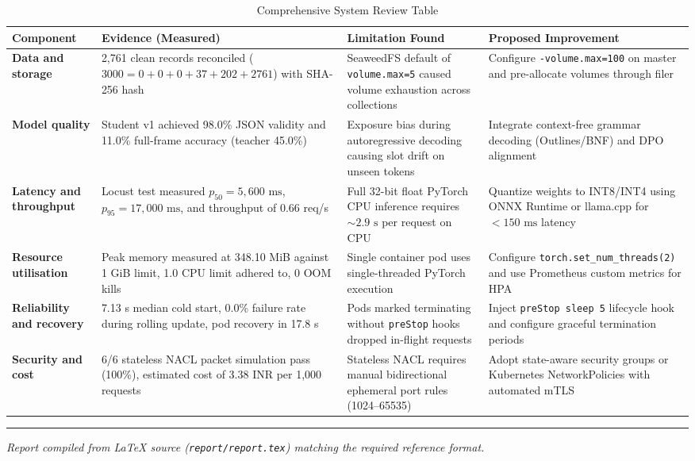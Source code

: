 \documentclass[10pt,a4paper]{article}
\begin{document}
\begin{table}[h!]
\centering
\small
\begin{tabularx}{\textwidth}{l p{3.6cm} Y Y}
\toprule
\textbf{Component} & \textbf{Evidence (Measured)} & \textbf{Limitation Found} & \textbf{Proposed Improvement} \\
\midrule
\textbf{Data and storage} & 2,761 clean records reconciled ($3000 = 0 + 0 + 0 + 37 + 202 + 2761$) with SHA-256 hash & SeaweedFS default of \texttt{volume.max=5} caused volume exhaustion across collections & Configure \texttt{-volume.max=100} on master and pre-allocate volumes through filer \\
\addlinespace[4pt]
\textbf{Model quality} & Student v1 achieved 98.0\% JSON validity and 11.0\% full-frame accuracy (teacher 45.0\%) & Exposure bias during autoregressive decoding causing slot drift on unseen tokens & Integrate context-free grammar decoding (Outlines/BNF) and DPO alignment \\
\addlinespace[4pt]
\textbf{Latency and throughput} & Locust test measured $p_{50} = 5,600\text{ ms}$, $p_{95} = 17,000\text{ ms}$, and throughput of 0.66 req/s & Full 32-bit float PyTorch CPU inference requires $\sim 2.9\text{ s}$ per request on CPU & Quantize weights to INT8/INT4 using ONNX Runtime or llama.cpp for $< 150\text{ ms}$ latency \\
\addlinespace[4pt]
\textbf{Resource utilisation} & Peak memory measured at 348.10 MiB against 1 GiB limit, 1.0 CPU limit adhered to, 0 OOM kills & Single container pod uses single-threaded PyTorch execution & Configure \texttt{torch.set\_num\_threads(2)} and use Prometheus custom metrics for HPA \\
\addlinespace[4pt]
\textbf{Reliability and recovery} & 7.13 s median cold start, 0.0\% failure rate during rolling update, pod recovery in 17.8 s & Pods marked terminating without \texttt{preStop} hooks dropped in-flight requests & Inject \texttt{preStop sleep 5} lifecycle hook and configure graceful termination periods \\
\addlinespace[4pt]
\textbf{Security and cost} & 6/6 stateless NACL packet simulation pass (100\%), estimated cost of 3.38 INR per 1,000 requests & Stateless NACL requires manual bidirectional ephemeral port rules (1024--65535) & Adopt state-aware security groups or Kubernetes NetworkPolicies with automated mTLS \\
\bottomrule
\end{tabularx}
\caption{Comprehensive System Review Table}
\label{tab:review_table}
\end{table}

\vspace{12pt}
\hrule
\vspace{8pt}
\begin{center}
    \small \textit{Report compiled from LaTeX source (\texttt{report/report.tex}) matching the required reference format.}
\end{center}
\end{document}

